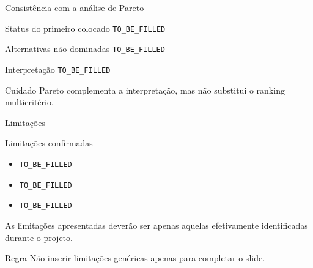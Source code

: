 \begin{frame}{Consistência com a análise de Pareto}

    \begin{block}{Status do primeiro colocado}
        \texttt{TO\_BE\_FILLED}
    \end{block}

    \vspace{0.3cm}

    \begin{block}{Alternativas não dominadas}
        \texttt{TO\_BE\_FILLED}
    \end{block}

    \vspace{0.3cm}

    \begin{block}{Interpretação}
        \texttt{TO\_BE\_FILLED}
    \end{block}

    \vspace{0.2cm}

    \begin{alertblock}{Cuidado}
        Pareto complementa a interpretação, mas não substitui o ranking
        multicritério.
    \end{alertblock}

\end{frame}



\begin{frame}{Limitações}

    \begin{block}{Limitações confirmadas}
        \begin{itemize}
            \item \texttt{TO\_BE\_FILLED}
            \item \texttt{TO\_BE\_FILLED}
            \item \texttt{TO\_BE\_FILLED}
        \end{itemize}
    \end{block}

    \vspace{0.3cm}

    As limitações apresentadas deverão ser apenas aquelas
    efetivamente identificadas durante o projeto.

    \vspace{0.2cm}

    \begin{alertblock}{Regra}
        Não inserir limitações genéricas apenas para completar o slide.
    \end{alertblock}

\end{frame}


